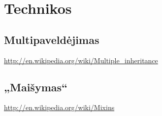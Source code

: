 \chapter{Technikos}

\section{Multipaveldėjimas}

\url{http://en.wikipedia.org/wiki/Multiple_inheritance}

\section{„Maišymas“}

\url{http://en.wikipedia.org/wiki/Mixins}
